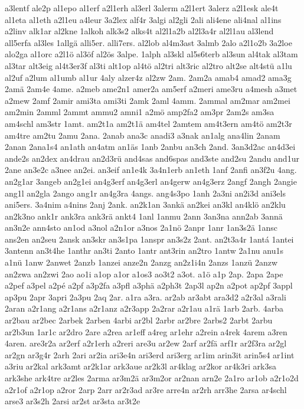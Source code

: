 {a3lentf
ale2p
al1epo
al1erf
a2l1erh
al3erl
3alerm
a2l1ert
3alerz
a2l1esk
ale4t
al1eta
al1eth
a2l1eu
a4leur
3a2lex
alf4r
3algi
al2gli
2ali
ali4ene
ali4nal
al1ins
a2linv
alk1ar
al2kne
1alkoh
alk3s2
alks4t
al2l1a2b
al2l3a4r
al2l1au
al3lend
all5erfa
al3les
1allgä
alli5er.
alli7ers.
al2lob
al4m3ast
3almb
2alo
a2l1o2b
3a2loe
alo2ga
al1orc
a2l1ö
al3öf
al2ös
3alpe.
1alph
al3skl
al5s6terb
al3sun
al4tak
al3tam
al3tar
alt3eig
al4t3er3f
al3ti
alt1op
al4tö
al2tri
alt3ric
al2tro
alt2se
alt4stü
a1lu
al2uf
a2lum
al1umb
al1ur
4aly
alzer4z
al2zw
2am.
2am2a
amab4
amad2
ama3g
2amä
2am4e
4ame.
a2meb
ame2n1
amer2a
am5erf
a2meri
ame3ru
a4mesh
a3met
a2mew
2amf
2amir
ami3ta
ami3ti
2amk
2aml
4amm.
2ammal
am2mar
am2mei
am2min
2amml
2ammt
ammu2
amni1
a2mö
amp2fa2
am3pr
2am2s
am3sa
am4schl
am3str
1amt.
am2t1a
am2t1ä
am4tel
2amtem
am4t3ern
am4tö
am2t3r
am4tre
am2tu
2amu
2ana.
2anab
ana3c
anadi3
a3nak
an1alg
ana4lin
2anam
2anan
2ana1s4
an1ath
an4atm
an1äs
1anb
2anbu
an3ch
2and.
3an3d2ac
an4d3ei
ande2s
an2dex
an4drau
an2d3rü
and4sas
and6spas
and3ste
and2su
2andu
and1ur
2ane
an3e2c
a3nee
an2ei.
an3eif
an1e4k
3a4n1erb
an1eth
1anf
2anfi
an3f2u
4ang.
an2g1ar
3angeb
an2g1ei
an4g3erf
an4g3erl
an4gerw
an4g3erz
2angf
2angh
2angie
ang1l
an2gla
2ango
ang1r
an4g3ra
4angs.
ang4s3po
1anh
2a3ni
an2i3d
ani3els
ani5ers.
3a4nim
a4nins
2anj
2ank.
an2k1an
3ankä
an2kei
an3kl
an4klö
an2klu
an2k3no
ank1r
ank3ra
ank3rä
ankt4
1anl
1anmu
2ann
3an3na
ann2ab
3annä
an3n2e
ann4sto
an1od
a3nol
a2n1or
a3nos
2a1nö
2anpr
1anr
1an3s2ä
1ansc
ans2en
an2seu
2ansk
an3skr
an3s1pa
1anspr
an3s2z
2ant.
an2t3a4r
1antá
1antei
3antenn
an3t4he
1anthr
an3ti
2anto
1antr
ant3rin
an2tro
1antw
2a1nu
anu1s
a1nü
1anw
2anwet
2anzb
1anzei
anze2n
2anzg
an2z1i4n
2anzs
1anzü
2anzw
an2zwa
an2zwi
2ao
ao1i
a1op
a1or
a1os3
ao3t2
a3ot.
a1ö
a1p
2ap.
2apa
2ape
a2pef
a3pel
a2pé
a2pf
a3p2fa
a3pfl
a3phä
a2ph3t
2ap3l
ap2n
a2pot
ap2pf
3appl
ap3pu
2apr
3apri
2a3pu
2aq
2ar.
a1ra
a3ra.
ar2ab
ar3abt
ara3d2
a2r3al
a3rali
2aran
a2r1ang
a2r1ans
a2r1anz
a2r3app
2a2rar
a2r1au
a1rä
1arb
2arb.
4arba
ar2bau
ar2bec
2arbek
2arben
4arbi
ar2bl
2arbr
ar2bre
2arbs2
2arbt
2arbu
ar2b3un
1ar1c
ar2dro
2are
a2rea
ar1eff
a4reg
ar1ehr
a2rein
a4rek
4arem
a3ren
4aren.
are3r2a
ar2erf
a2r1erh
a2reri
are3u
ar2ew
2arf
ar2fä
arf1r
ar2f3ra
ar2gl
ar2gn
ar3g4r
2arh
2ari
ar2ia
ari3e4n
ari3erd
ari3erg
ar1im
arin3it
arin5s4
ar1int
a3riu
ar2kal
ark3amt
ar2k1ar
ark3aue
ar2k3l
ar4klag
ar2kor
ar4k3ri
ark3sa
ark3she
ark4tre
ar2les
2arma
ar3m2ä
ar3m2or
ar2nan
arn2e
2a1ro
ar1ob
a2r1o2d
a2r1of
a2r1op
a2ror
2arp
2arr
ar2r3ad
ar3re
arre4n
ar2rh
arr3he
2arsa
ar4schl
arse3
ar3s2h
2arsi
ar2st
ar3sta
ar3t2e
}
